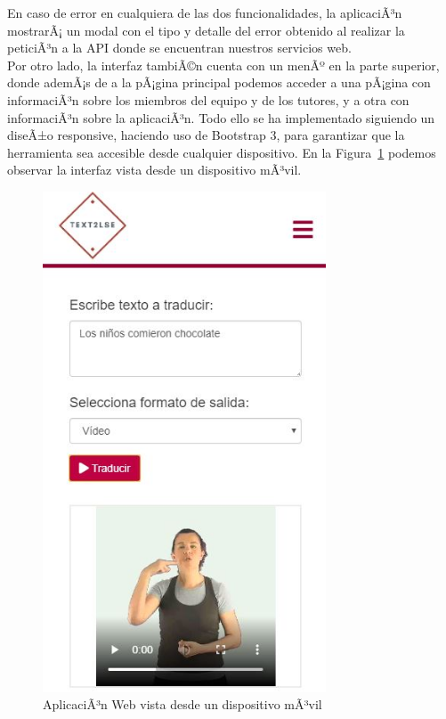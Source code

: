 En caso de error en cualquiera de las dos funcionalidades, la aplicaciÃ³n mostrarÃ¡ un modal con el tipo y detalle del error obtenido al realizar la peticiÃ³n a la API donde se encuentran nuestros servicios web.\\ 

Por otro lado, la interfaz tambiÃ©n cuenta con un menÃº en la parte superior, donde ademÃ¡s de a la pÃ¡gina principal podemos acceder a una pÃ¡gina con informaciÃ³n sobre los miembros del equipo y de los tutores, y a otra con informaciÃ³n sobre la aplicaciÃ³n. Todo ello se ha implementado siguiendo un diseÃ±o responsive, haciendo uso de Bootstrap 3, para garantizar que la herramienta sea accesible desde cualquier dispositivo. En la Figura~\ref {fig: imgResponsive} podemos observar la interfaz vista desde un dispositivo mÃ³vil.\\


\begin{figure}[]
	\centering
	\includegraphics[width=0.75\textwidth]{Imagenes/Fuentes/Text2LSE/responsive.jpg}
	\caption{ AplicaciÃ³n Web vista desde un dispositivo mÃ³vil }
	\label {fig: imgResponsive}
\end{figure}




